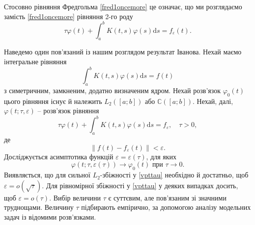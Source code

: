 \documentclass[14pt,twoside]{extreport}
\theoremstyle{mystyle}
\numberwithin{equation}{chapter}
\newcommand{\cab}{\mathbb{C}([a; b])}
\begin{document}
Стосовно рівняння Фредгольма \eqref{fred1oncemore} це означає, що ми розглядаємо замість \eqref{fred1oncemore} рівняння 2-го роду
\[
 \tau\varphi(t) + \int_{a}^{b} K(t, s) \varphi(s) \mathrm{d}s = f_{\varepsilon}(t).
\]

Наведемо один пов'язаний із нашим розглядом результат Іванова. Нехай маємо інтегральне рівняння
\[
 \int_{a}^{b} K(t, s) \varphi(s) \mathrm{d}s = f(t)
\]
з симетричним, замкненим, додатно визначеним ядром. Нехай розв'язок $\varphi_0(t)$ цього рівняння існує й належить $L_2([a; b])$ або $\cab$. Нехай, далі, $\varphi(t; \tau, \varepsilon)$ -- розв'язок рівняння
\[
 \tau \varphi(t) + \int_{a}^{b} K(t, s) \varphi(s) \mathrm{d}s = f_{\varepsilon}, \quad \tau > 0,
\]
де
\[
 \|f(t) - f_{\varepsilon}(t)\| < \varepsilon.
\]
Досліджується асимптотика функцій $\varepsilon = \varepsilon(\tau)$, для яких
\begin{equation}\label{vpttau}
 \varphi(t; \tau, \varepsilon(\tau)) \to \varphi_0(t) \textrm{ при } \tau \to 0.
\end{equation}
Виявляється, що для сильної $L_2$-збіжності у \eqref{vpttau} необхідно й достатньо, щоб $\varepsilon = o(\sqrt{\tau})$. Для рівномірної збіжності у \eqref{vpttau} у деяких випадках досить, щоб $\varepsilon = o(\tau)$. Вибір величини $\tau$ є суттєвим, але пов'язаним зі значними труднощами. Величину $\tau$ підбирають емпірично, за допомогою аналізу модельних задач із відомими розв'язками.
\end{document}
